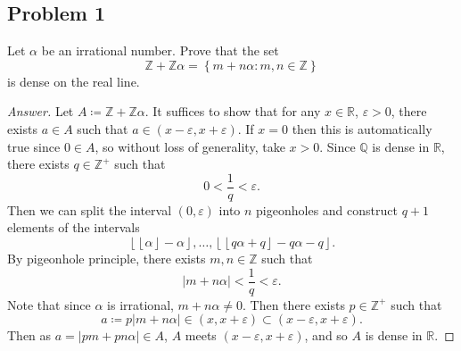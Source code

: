 \documentclass[12pt]{article}
\newcommand{\z}{\mathbb{Z}}
\newcommand{\q}{\mathbb{Q}}
\newcommand{\real}{\mathbb{R}}
\newcommand\setb[1]{\left \{ #1 \right \}}
\newcommand{\abs}[1]{\left | #1 \right |}
\newcommand{\eps}{\varepsilon}
\newcommand{\fl}[1]{\left \lfloor #1 \right \rfloor}
\theoremstyle{definition}
\begin{document}
\subsection{Problem 1 \texorpdfstring{\cite{Melody}}{}}
Let $\alpha$ be an irrational number. Prove that the set 
\[
    \z + \z \alpha = \setb{ m + n \alpha : m , n \in \z }
\]
is dense on the real line.
\begin{proof}[Answer]
    Let $A \coloneqq \z + \z \alpha$. It suffices to show that for any $x \in \real$, $\eps > 0$, there exists $a \in A$ such that $a \in (x - \eps , x + \eps)$. If $x = 0$ then this is automatically true since $0 \in A$, so without loss of generality, take $x > 0$. Since $\q$ is dense in $\real$, there exists $q \in \z^+$ such that 
    \[
        0 < \frac{1}{q} < \eps . 
    \]
    Then we can split the interval $(0,\eps)$ into $n$ pigeonholes and construct $q + 1$ elements of the intervals 
    \[
        \fl{ \fl{\alpha} - \alpha } , \dotsc , \fl{ \fl{ q \alpha + q } - q \alpha - q } . 
    \]
    By pigeonhole principle, there exists $m , n \in \z$ such that 
    \[
        \abs{ m + n \alpha } < \frac{1}{q} < \eps . 
    \]
    Note that since $\alpha$ is irrational, $m + n \alpha \neq 0$. Then there exists $p \in \z^+$ such that 
    \[
        a \coloneqq p \abs{ m + n \alpha } \in (x,x+\eps) \subset (x-\eps,x+\eps) . 
    \]
    Then as $a = \abs{pm + pn \alpha} \in A$, $A$ meets $(x-\eps,x+\eps)$, and so $A$ is dense in $\real$. 
\end{proof}
\end{document}
